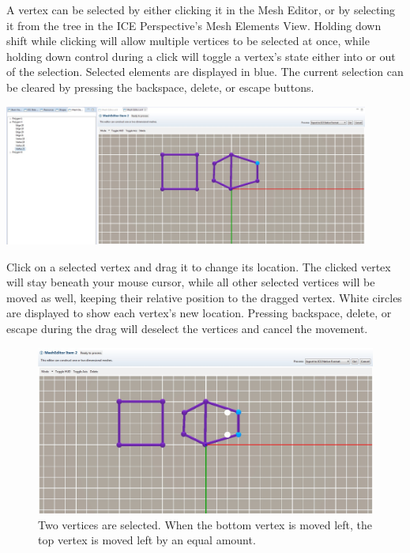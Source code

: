 \documentclass{article}
\begin{document}
A vertex can be selected by either clicking it in the Mesh Editor, or by
selecting it from the tree in the ICE Perspective's Mesh Elements View. Holding
down shift while clicking will allow multiple vertices to be selected at once,
while holding down control during a click will toggle a vertex's state either
into or out of the selection. Selected elements are displayed in blue.
The current selection can be cleared by pressing the backspace, delete, or
escape buttons.

\begin{center}
\includegraphics[width=12cm]{images/MeshEditorSelection}
\end{center}

Click on a selected vertex and drag it to change its location. The clicked
vertex will stay beneath your mouse cursor, while all other selected vertices
will be moved as well, keeping their relative position to the dragged vertex.
White circles are displayed to show each vertex's new location. Pressing
backspace, delete, or escape during the drag will deselect the vertices and
cancel the movement.

\begin{figure}
\begin{center}
\includegraphics[width=12cm]{images/MeshEditorDragVertex}
\caption{Two vertices are selected. When the bottom vertex is moved left, the
top vertex is moved left by an equal amount.}
\end{center}
\end{figure}
\end{document}
